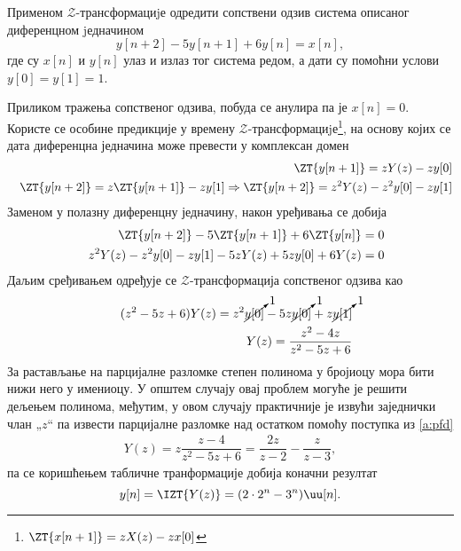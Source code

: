 \PID 
Применом $\mathcal{Z}$-трансформациjе одредити сопствени одзив система описаног диференцном jедначином
$$
    y[n+2] - 5 y[n + 1] + 6 y[n] = x[n],
$$
где су $x[n]$ и $y[n]$ улаз и излаз тог система редом, а дати су помоћни услови $y[0] = y[1] = 1$.

\RESENJE

Приликом тражења сопственог одзива, побуда се анулира па је $x[n] = 0$.
Користе се особине предикције у времену $\mathcal{Z}$-трансформациjе\footnote{
    $\ZT{x[n+1]} = z X(z) - z x[0]$
}, на основу којих се дата диференцна једначина може превести у комплексан домен 
\begin{eqnarray}
    &&
    \ZT{y[n+1]} = z Y(z) - z y[0] 
    \\
    &&
    \ZT{y[n+2]} = z \ZT{y[n+1]}  - z y[1] 
    \Rightarrow
    \ZT{y[n+2]} = z^2 Y(z) - z^2 y[0]  - z y[1] 
\end{eqnarray}
Заменом у полазну диференцну једначину, након уређивања се добија 
\begin{eqnarray}
    && 
    \ZT{y[n+2]} - 5 \ZT{y[n + 1]} + 6 \ZT{y[n]} = 0 \\
    && 
    z^2 Y(z) - z^2 y[0]  - z y[1] 
    -5z Y(z) + 5z y[0]
    + 6 Y(z) = 0 \\
\end{eqnarray}
Даљим сређивањем одређује се $\mathcal{Z}$-трансформација сопственог одзива као
\begin{eqnarray}
    && (z^2 - 5z + 6) Y(z) = z^2 \cancelto{1}{y[0]} - 5z \cancelto{1}{y[0]} + z \cancelto{1}{y[1]}  \\
    && Y(z) = \dfrac{z^2 - 4z}{z^2 - 5z + 6}
\end{eqnarray}
За растављање на парцијалне разломке степен полинома у бројиоцу мора бити нижи него у имениоцу. У општем случају овај проблем 
могуће је решити дељењем полинома, међутим, у овом случају практичније је извући заједнички члан „$z$“ па извести парцијалне разломке 
над остатком помоћу поступка из \ref{a:pfd}
\begin{eqnarray}
    Y(z) = z \dfrac{z - 4}{z^2 - 5z + 6} = \dfrac{2z}{z - 2} - \dfrac{z}{z - 3},
\end{eqnarray}
па се коришћењем табличне транформације  добија коначни резултат 
\begin{equation}
    y[n] = \IZT{Y(z)} = (2 \cdot 2^n - 3^n) \uu[n].
\end{equation}
